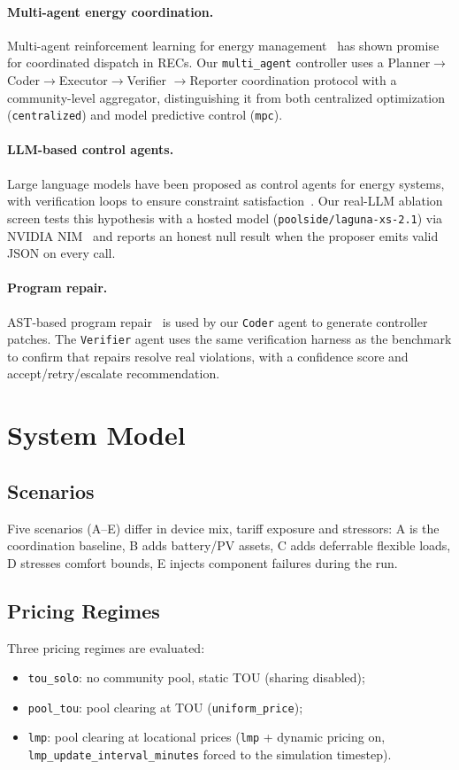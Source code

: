 \documentclass[sigconf,nonacm]{acmart}
\begin{document}
\paragraph{Multi-agent energy coordination.} Multi-agent reinforcement
learning for energy management~\cite{energynet2021} has shown promise for
coordinated dispatch in RECs. Our \texttt{multi\_agent} controller uses a
Planner$\rightarrow$Coder$\rightarrow$Executor$\rightarrow$Verifier%
$\rightarrow$Reporter coordination protocol with a community-level
aggregator, distinguishing it from both centralized optimization
(\texttt{centralized}) and model predictive control (\texttt{mpc}).

\paragraph{LLM-based control agents.} Large language models have been
proposed as control agents for energy systems, with verification loops to
ensure constraint satisfaction~\cite{openai2023}. Our real-LLM ablation
screen tests this hypothesis with a hosted model
(\texttt{poolside/laguna-xs-2.1}) via NVIDIA NIM~\cite{nim2024} and reports
an honest null result when the proposer emits valid JSON on every call.

\paragraph{Program repair.} AST-based program
repair~\cite{ast2020} is used by our \texttt{Coder} agent to generate
controller patches. The \texttt{Verifier} agent uses the same verification
harness as the benchmark to confirm that repairs resolve real violations,
with a confidence score and accept/retry/escalate recommendation.

\section{System Model}\label{sec:model}

\subsection{Scenarios}
Five scenarios (A--E) differ in device mix, tariff exposure and stressors:
A is the coordination baseline, B adds battery/PV assets, C adds deferrable
flexible loads, D stresses comfort bounds, E injects component failures during
the run.

\subsection{Pricing Regimes}
Three pricing regimes are evaluated:
\begin{itemize}
\item \texttt{tou\_solo}: no community pool, static TOU (sharing disabled);
\item \texttt{pool\_tou}: pool clearing at TOU (\texttt{uniform\_price});
\item \texttt{lmp}: pool clearing at locational prices (\texttt{lmp} +
  dynamic pricing on, \texttt{lmp\_update\_interval\_minutes} forced to the
  simulation timestep).
\end{itemize}
\end{document}
